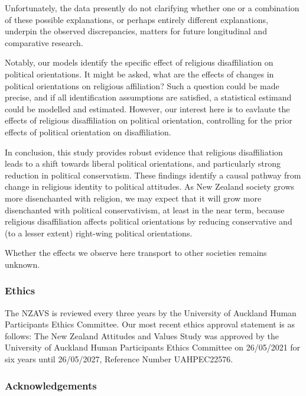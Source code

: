 \documentclass[
  singlecolumn]{article}
\begin{document}
Unfortunately, the data presently do not clarifying whether one or a
combination of these possible explanations, or perhaps entirely
different explanations, underpin the observed discrepancies, matters for
future longitudinal and comparative research.

Notably, our models identify the specific effect of religious
disaffiliation on political orientations. It might be asked, what are
the effects of changes in political orientations on religious
affiliation? Such a question could be made precise, and if all
identification assumptions are satisfied, a statistical estimand could
be modelled and estimated. However, our interest here is to eavlaute the
effects of religious disaffiliation on political orientation,
controlling for the prior effects of political orientation on
disaffiliation.

In conclusion, this study provides robust evidence that religious
disaffiliation leads to a shift towards liberal political orientations,
and particularly strong reduction in political conservatism. These
findings identify a causal pathway from change in religious identity to
political attitudes. As New Zealand society grows more disenchanted with
religion, we may expect that it will grow more disenchanted with
political conservativism, at least in the near term, because religious
disaffiliation affects political orientations by reducing conservative
and (to a lesser extent) right-wing political orientations.

Whether the effects we observe here transport to other societies remains
unknown.

\newpage{}

\subsubsection{Ethics}\label{ethics}

The NZAVS is reviewed every three years by the University of Auckland
Human Participants Ethics Committee. Our most recent ethics approval
statement is as follows: The New Zealand Attitudes and Values Study was
approved by the University of Auckland Human Participants Ethics
Committee on 26/05/2021 for six years until 26/05/2027, Reference Number
UAHPEC22576.

\subsubsection{Acknowledgements}\label{acknowledgements}
\end{document}
